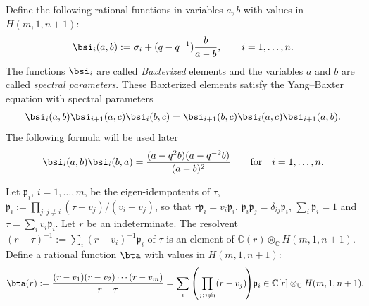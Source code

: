 Def\/ine the following rational functions in variables $a,b$ with values in $H(m,1,n+1)$:
\begin{gather}\label{bax-s}
\bsi_i(a,b):=\sigma_i+(q-q^{-1})\frac{b}{a-b}  ,\qquad i=1,\dots,n  .
\end{gather}
The functions $\bsi_i$ are called {\it Baxterized} elements and the variables $a$ and $b$ are called {\it spectral parameters}.
These Baxterized elements satisfy the Yang--Baxter equation with spectral para\-me\-ters
\begin{gather*}
\bsi_i(a,b)\bsi_{i+1}(a,c)\bsi_i(b,c)=\bsi_{i+1}(b,c)\bsi_i(a,c)\bsi_{i+1}(a,b) .
\end{gather*}
The following formula will be used later
\begin{gather}\label{baxt-inv1}
 \bsi_i(a,b)\bsi_i(b,a)=\frac{(a-q^2b)(a-q^{-2}b)}{(a-b)^2} \qquad\textrm{for \ \ $i=1,\dots,n$}.
\end{gather}

Let $\mathfrak{p}_i$, $i=1,\dots,m$,
be the eigen-idempotents of $\tau$, $\mathfrak{p}_i:=\prod\limits_{j:j\neq i} (\tau-v_j)/(v_i-v_j)$, so that $\tau\mathfrak{p}_i=v_i\mathfrak{p}_i$, $\mathfrak{p}_i\mathfrak{p}_j=\delta_{ij}\mathfrak{p}_i$, $\sum_i \mathfrak{p}_i=1$ and $\tau=\sum_i v_i\mathfrak{p}_i$.
Let $r$ be an indeterminate.
The resolvent $(r-\tau)^{-1}:=\sum_i(r-v_i)^{-1}\mathfrak{p}_i$ of $\tau$ is an element of
$\mathbb{C}(r)\otimes_{\mathbb{C}} H(m,1,n+1)$.
Def\/ine a rational function $\bta$ with values in $H(m,1,n+1)$:
\begin{gather}\label{bax-t2}
\bta(r):=\frac{(r-v_1)(r-v_2)\cdots(r-v_m)}{r-\tau}=\sum_i\left(\prod_{j:j\neq i} (r-v_j)\!\right)\!\mathfrak{p}_i\in\mathbb{C}[r]\otimes_{\mathbb{C}} H(m,1,n+1)  .\!\!\!
\end{gather}

